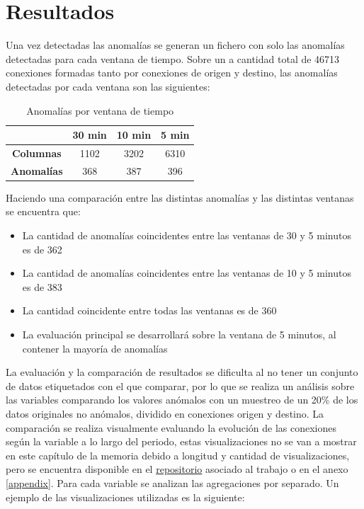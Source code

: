 \chapter{Resultados}
\label{chapter:Resultados}

Una vez detectadas las anomalías se generan un fichero con solo las anomalías detectadas para cada ventana de tiempo. Sobre un a cantidad total de 46713 conexiones formadas tanto por conexiones de origen y destino, las anomalías detectadas por cada ventana son las siguientes:

\begin{table}[H]
    \centering
    \begin{tabular}{|c|c|c|c|}
    \hline
    \; & 30 min & 10 min & 5 min \\ [0.5ex]
    \hline
        \textbf{Columnas} & 1102 & 3202 & 6310 \\
        \hline
        \textbf{Anomalías} & 368 & 387 & 396 \\ [1ex]
    \hline
    \end{tabular}
    \caption{Anomalías por ventana de tiempo}
    \label{tab:results}
\end{table}

Haciendo una comparación entre las distintas anomalías y las distintas ventanas se encuentra que:
\begin{itemize}
    \item La cantidad de anomalías coincidentes entre las ventanas de 30 y 5 minutos es de 362
    \item La cantidad de anomalías coincidentes entre las ventanas de 10 y 5 minutos es de 383
    \item La cantidad coincidente entre todas las ventanas es de 360
    \item La evaluación principal se desarrollará sobre la ventana de 5 minutos, al contener la mayoría de anomalías
\end{itemize}

La evaluación y la comparación de resultados se dificulta al no tener un conjunto de datos etiquetados con el que comparar, por lo que se realiza un análisis sobre las variables comparando los valores anómalos con un muestreo de un 20\% de los datos originales no anómalos, dividido en conexiones origen y destino. La comparación se realiza visualmente evaluando la evolución de las conexiones según la variable a lo largo del periodo, estas visualizaciones no se van a mostrar en este capítulo de la memoria debido a longitud y cantidad de visualizaciones, pero se encuentra disponible en el \href{https://github.com/Gonmeso/TFM_Anomaly_Detection/blob/master/models/Anomaly_Detection_Evaluation.ipynb}{repositorio}  asociado al trabajo o en el anexo \ref{appendix}. Para cada variable se analizan las agregaciones por separado. Un ejemplo de las visualizaciones utilizadas es la siguiente:

